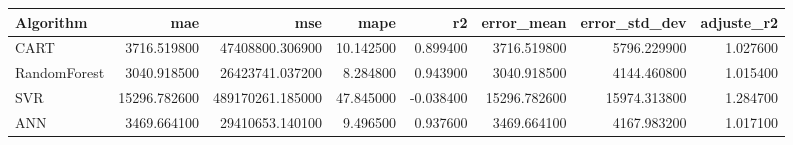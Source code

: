 \begin{tabular}{lrrrrrrr}
\toprule
Algorithm & mae & mse & mape & r2 & error_mean & error_std_dev & adjuste_r2 \\
\midrule
CART & 3716.519800 & 47408800.306900 & 10.142500 & 0.899400 & 3716.519800 & 5796.229900 & 1.027600 \\
RandomForest & 3040.918500 & 26423741.037200 & 8.284800 & 0.943900 & 3040.918500 & 4144.460800 & 1.015400 \\
SVR & 15296.782600 & 489170261.185000 & 47.845000 & -0.038400 & 15296.782600 & 15974.313800 & 1.284700 \\
ANN & 3469.664100 & 29410653.140100 & 9.496500 & 0.937600 & 3469.664100 & 4167.983200 & 1.017100 \\
\bottomrule
\end{tabular}
